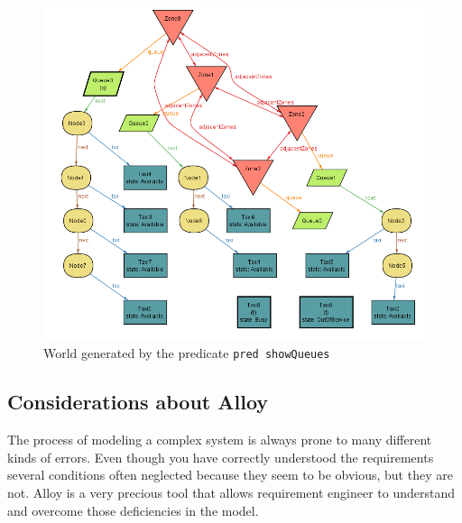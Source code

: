 \begin{figure}[H]
\begin{centering}
\includegraphics[scale=0.6]{alloy/instances/queues}
\par\end{centering}

\protect\caption{World generated by the predicate \lstinline!pred showQueues!}


\end{figure}



\subsection{Considerations about Alloy}

The process of modeling a complex system is always prone to many different
kinds of errors. Even though you have correctly understood the requirements
several conditions often neglected because they seem to be obvious,
but they are not. Alloy is a very precious tool that allows requirement
engineer to understand and overcome those deficiencies in the model. 
